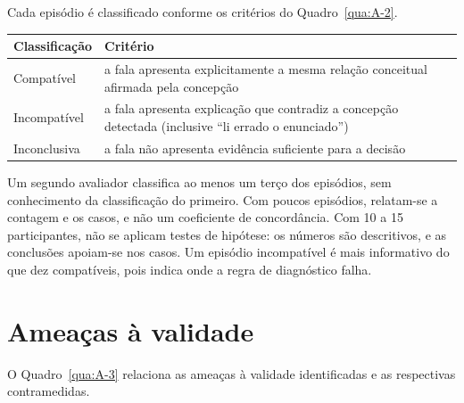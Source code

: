 Cada episódio é classificado conforme os critérios do Quadro~\ref{qua:A-2}.

\begin{quadro}[htbp]
\caption{Classificação dos episódios de V2}\label{qua:A-2}
\footnotesize
\begin{tabularx}{\textwidth}{|X|X|}
\hline
\textbf{Classificação} & \textbf{Critério} \\ \hline
Compatível & a fala apresenta explicitamente a mesma relação conceitual afirmada pela concepção \\ \hline
Incompatível & a fala apresenta explicação que contradiz a concepção detectada (inclusive ``li errado o enunciado'') \\ \hline
Inconclusiva & a fala não apresenta evidência suficiente para a decisão \\ \hline
\end{tabularx}
\end{quadro}

Um segundo avaliador classifica ao menos um terço dos episódios, sem conhecimento da classificação do primeiro. Com poucos episódios, relatam-se a contagem e os casos, e não um coeficiente de concordância. Com 10 a 15 participantes, não se aplicam testes de hipótese: os números são descritivos, e as conclusões apoiam-se nos casos. Um episódio incompatível é mais informativo do que dez compatíveis, pois indica onde a regra de diagnóstico falha.

\section{Ameaças à validade}

O Quadro~\ref{qua:A-3} relaciona as ameaças à validade identificadas e as respectivas contramedidas.

